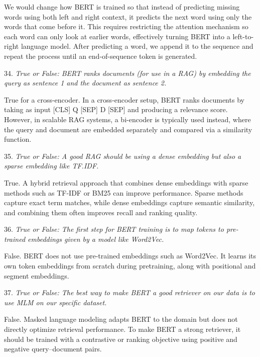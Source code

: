 We would change how BERT is trained so that instead of predicting missing words using both left and right context, it predicts the next word using only the words that come before it. This requires restricting the attention mechanism so each word can only look at earlier words, effectively turning BERT into a left-to-right language model. After predicting a word, we append it to the sequence and repeat the process until an end-of-sequence token is generated.

\vspace{1cm}

34. \textit{True or False: BERT ranks documents (for use in a RAG) by embedding the query as sentence 1 and the document as sentence 2.}

True for a cross-encoder. In a cross-encoder setup, BERT ranks documents by taking as input [CLS] Q [SEP] D [SEP] and producing a relevance score. However, in scalable RAG systems, a bi-encoder is typically used instead, where the query and document are embedded separately and compared via a similarity function.

\vspace{1cm}

35. \textit{True or False: A good RAG should be using a dense embedding but also a sparse embedding like TF.IDF.}

True. A hybrid retrieval approach that combines dense embeddings with sparse methods such as TF-IDF or BM25 can improve performance. Sparse methods capture exact term matches, while dense embeddings capture semantic similarity, and combining them often improves recall and ranking quality.

\vspace{1cm}

36. \textit{True or False: The first step for BERT training is to map tokens to pre-trained embeddings given by a model like Word2Vec.}

False. BERT does not use pre-trained embeddings such as Word2Vec. It learns its own token embeddings from scratch during pretraining, along with positional and segment embeddings.

\vspace{1cm}

37. \textit{True or False: The best way to make BERT a good retriever on our data is to use MLM on our specific dataset.}

False. Masked language modeling adapts BERT to the domain but does not directly optimize retrieval performance. To make BERT a strong retriever, it should be trained with a contrastive or ranking objective using positive and negative query–document pairs.

